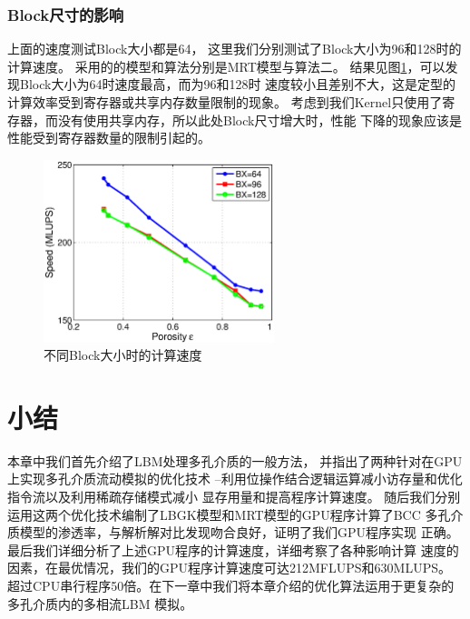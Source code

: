 \subsubsection{Block尺寸的影响}
上面的速度测试Block大小都是64， 这里我们分别测试了Block大小为96和128时的计算速度。
采用的的模型和算法分别是MRT模型与算法二。
结果见图\ref{fig:speed_block}，可以发现Block大小为64时速度最高，而为96和128时
速度较小且差别不大，这是定型的计算效率受到寄存器或共享内存数量限制的现象。
考虑到我们Kernel只使用了寄存器，而没有使用共享内存，所以此处Block尺寸增大时，性能
下降的现象应该是性能受到寄存器数量的限制引起的。
\begin{figure}[htb]
  \centering
  \includegraphics[width=0.6\textwidth]{img/speed_block}
  \caption{不同Block大小时的计算速度}
  \label{fig:speed_block}
\end{figure}

\section{小结}
本章中我们首先介绍了LBM处理多孔介质的一般方法，
并指出了两种针对在GPU上实现多孔介质流动模拟的优化技术
\---利用位操作结合逻辑运算减小访存量和优化指令流以及利用稀疏存储模式减小
显存用量和提高程序计算速度。
随后我们分别运用这两个优化技术编制了LBGK模型和MRT模型的GPU程序计算了BCC
多孔介质模型的渗透率，与解析解对比发现吻合良好，证明了我们GPU程序实现
正确。最后我们详细分析了上述GPU程序的计算速度，详细考察了各种影响计算
速度的因素，在最优情况，我们的GPU程序计算速度可达212MFLUPS和630MLUPS。
超过CPU串行程序50倍。在下一章中我们将本章介绍的优化算法运用于更复杂的多孔介质内的多相流LBM
模拟。
